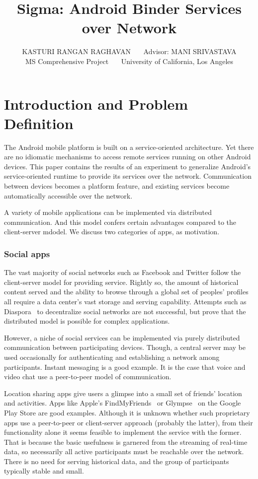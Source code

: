 \documentclass[prodmode]{acmlarge}
\title{Sigma: Android Binder Services over Network}
\author{KASTURI RANGAN RAGHAVAN~~~
Advisor: MANI SRIVASTAVA\\
MS Comprehensive Project~~~
University of California, Los Angeles
}
\begin{document}
\maketitle

\section{Introduction and Problem Definition}

The Android mobile platform is built on a service-oriented architecture. Yet there are no idiomatic mechanisms to access remote services running on other Android devices. This paper contains the results of an experiment to generalize Android's service-oriented runtime to provide its services over the network. Communication between devices becomes a platform feature, and existing services become automatically accessible over the network.

A variety of mobile applications can be implemented via distributed communication. And this model confers certain advantages compared to the client-server mdodel. We discuss two categories of apps, as motivation.

\subsubsection{Social apps}
The vast majority of social networks such as Facebook and Twitter follow the client-server model for providing service. Rightly so, the amount of historical content served and the ability to browse through a global set of peoples' profiles all require a data center's vast storage and serving capability. Attempts such as Diaspora~\cite{Diaspora} to decentralize social networks are not successful, but prove that the distributed model is possible for complex applications.

However, a niche of social services can be implemented via purely distributed communication between participating devices. Though, a central server may be used occasionally for authenticating and establishing a network among participants. Instant messaging is a good example. It is the case that voice and video chat use a peer-to-peer model of communication.

Location sharing apps give users a glimpse into a small set of friends' location and activities. Apps like Apple's FindMyFriends~\cite{FindMyFriends} or Glympse~\cite{Glympse} on the Google Play Store are good examples. Although it is unknown whether such proprietary apps use a peer-to-peer or client-server approach (probably the latter), from their functionality alone it seems feasible to implement the service with the former. That is because the basic usefulness is garnered from the streaming of real-time data, so necessarily all active participants must be reachable over the network. There is no need for serving historical data, and the group of participants typically stable and small.
\end{document}
